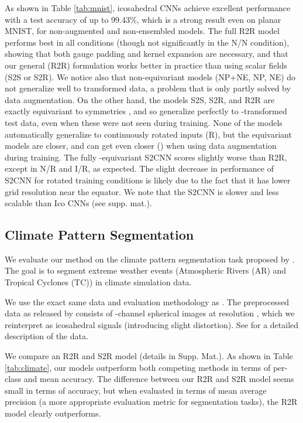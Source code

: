 \documentclass{article}
\begin{document}
As shown in Table \ref{tab:mnist}, icosahedral CNNs achieve excellent performance with a test accuracy of up to 99.43\%, which is a strong result even on planar MNIST, for non-augmented and non-ensembled models.
The full R2R model performs best in all conditions (though not significantly in the N/N condition), showing that both gauge padding and kernel expansion are necessary, and that our general (R2R) formulation works better in practice than using scalar fields (S2S or S2R).
We notice also that non-equivariant models (NP+NE, NP, NE) do not generalize well to transformed data, a problem that is only partly solved by data augmentation.
On the other hand, the models S2S, S2R, and R2R are exactly equivariant to symmetries , and so generalize perfectly to -transformed test data, even when these were not seen during training.
None of the models automatically generalize to continuously rotated inputs (R), but the equivariant models are closer, and can get even closer () when using  data augmentation during training.
The fully -equivariant S2CNN scores slightly worse than R2R, except in N/R and I/R, as expected.
The slight decrease in performance of S2CNN for rotated training conditions is likely due to the fact that it has lower grid resolution near the equator.
We note that the S2CNN is slower and less scalable than Ico CNNs (see supp. mat.).

\subsection{Climate Pattern Segmentation}

We evaluate our method on the climate pattern segmentation task proposed by \citet{mudigondaSegmentingTrackingExtreme}.
The goal is to segment extreme weather events (Atmospheric Rivers (AR) and Tropical Cyclones (TC)) in climate simulation data.

We use the exact same data and evaluation methodology as \cite{jiangSphericalCNNsUnstructured2018}.
The preprocessed data as released by \cite{jiangSphericalCNNsUnstructured2018} consists of -channel spherical images at resolution , which we reinterpret as icosahedral signals (introducing slight distortion).
See \cite{mudigondaSegmentingTrackingExtreme} for a detailed description of the data.


We compare an R2R and S2R model (details in Supp. Mat.).
As shown in Table \ref{tab:climate}, our models outperform both competing methods in terms of per-class and mean accuracy.
The difference between our R2R and S2R model seems small in terms of accuracy, but when evaluated in terms of mean average precision (a more appropriate evaluation metric for segmentation tasks), the R2R model clearly outperforms.
\end{document}
